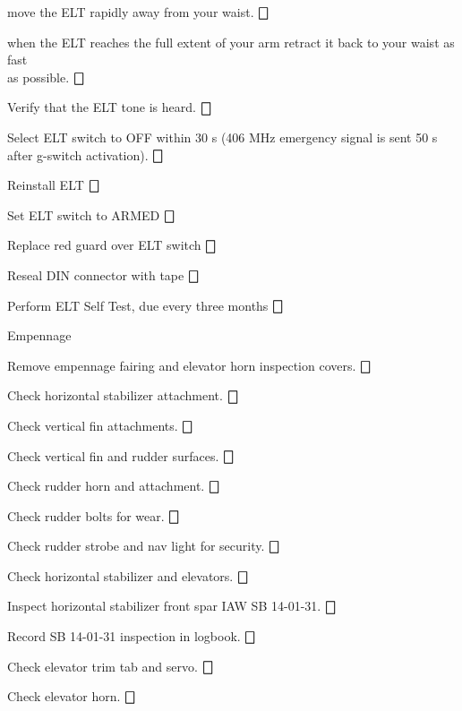 \begin{enumerate*}
\begin{enumerate*}
\begin{enumerate*}
\begin{enumerate*}
  		  \item move the ELT rapidly away from your waist. \dotfill $\bigbox$
  		  \item when the ELT reaches the full extent of your arm retract it back to your waist as fast \\as possible. \dotfill $\bigbox$
  		  \end{enumerate*} 
  		\item Verify that the ELT tone is heard. \dotfill $\bigbox$
  		\item Select ELT switch to OFF within 30 s (406 MHz emergency signal is sent 50 s after g-switch activation). \dotfill $\bigbox$
  	\end{enumerate*}
  	\item Reinstall ELT \dotfill $\bigbox$
  	\item Set ELT switch to ARMED \dotfill $\bigbox$
  	\item Replace red guard over ELT switch \dotfill $\bigbox$
  	\item Reseal DIN connector with tape \dotfill $\bigbox$
  	\item Perform ELT Self Test, due every three months \dotfill $\bigbox$
  \end{enumerate*}
	\item{Empennage} 
	\begin{enumerate*}
		\item Remove empennage fairing and elevator horn inspection covers. \dotfill $\bigbox$
		\item Check horizontal stabilizer attachment. \dotfill $\bigbox$
		\item Check vertical fin attachments. \dotfill $\bigbox$
		\item Check vertical fin and rudder surfaces. \dotfill $\bigbox$
		\item Check rudder horn and attachment. \dotfill $\bigbox$
		\item Check rudder bolts for wear. \dotfill $\bigbox$
		\item Check rudder strobe and nav light for security. \dotfill $\bigbox$
		\item Check horizontal stabilizer and elevators. \dotfill $\bigbox$
		\item Inspect horizontal stabilizer front spar IAW SB 14-01-31. \dotfill $\bigbox$
		\item Record SB 14-01-31 inspection in logbook. \dotfill $\bigbox$
		\item Check elevator trim tab and servo. \dotfill $\bigbox$
		\item Check elevator horn. \dotfill $\bigbox$

\end{enumerate*}
\end{enumerate*}
